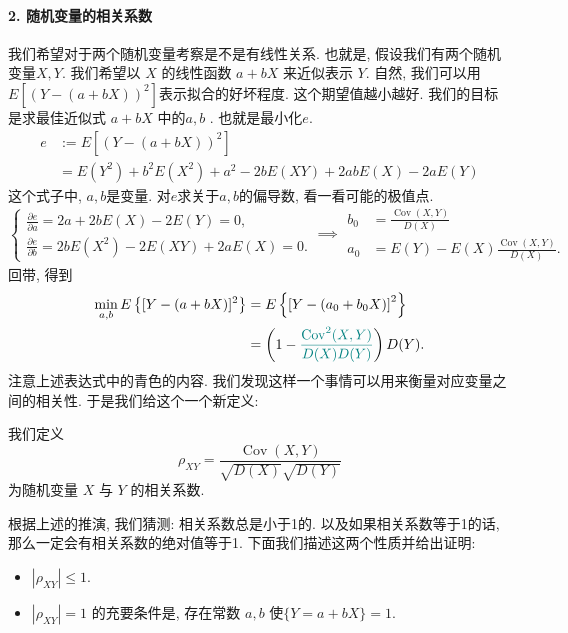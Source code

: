 \paragraph{2. 随机变量的相关系数} 我们希望对于两个随机变量考察是不是有线性关系. 也就是, 假设我们有两个随机变量$X,Y$. 我们希望以 $X$ 的线性函数 $a+b X$ 来近似表示 $Y$. 自然, 我们可以用$E\left[(Y-(a+b X))^2\right]$表示拟合的好坏程度. 这个期望值越小越好. 我们的目标是求最佳近似式 $a+b X$ 中的$a,b$ .
也就是最小化$e$.
 $$
\begin{aligned}
e & :=E\left[(Y-(a+b X))^2\right] \\
& =E\left(Y^2\right)+b^2 E\left(X^2\right)+a^2-2 b E(X Y)+2 a b E(X)-2 a E(Y)
\end{aligned}
$$
这个式子中, $a,b$是变量. 对$e$求关于$a,b $的偏导数, 看一看可能的极值点.
$$
\left\{\begin{array}{l}
\frac{\partial e}{\partial a}=2 a+2 b E(X)-2 E(Y)=0, \\
\frac{\partial e}{\partial b}=2 b E\left(X^2\right)-2 E(X Y)+2 a E(X)=0 .
\end{array}\right. \implies \begin{array}{ll}
b_0 & =\frac{\operatorname{Cov}(X, Y)}{D(X)} \\
a_0 & =E(Y)-E(X) \frac{\operatorname{Cov}(X, Y)}{D(X)} .
\end{array}
$$
回带, 得到
$$
\begin{aligned}
\min _{a, b} E\left\{[Y-(a+b X)]^2\right\} & =E\left\{\left[Y-\left(a_0+b_0 X\right)\right]^2\right\} \\
& =\left(1-{{\color{teal}\frac{\operatorname{Cov}^2(X, Y)}{{D(X)} {D(Y)}}}}\right) D(Y)  .
\end{aligned}
$$
注意上述表达式中的青色的内容. 我们发现这样一个事情可以用来衡量对应变量之间的相关性. 于是我们给这个一个新定义: 

\begin{definition}
    我们定义
    $$
    \rho_{X Y}=\frac{\operatorname{Cov}(X, Y)}{\sqrt{D(X)} \sqrt{D(Y)}}
    $$
    为随机变量 $X$ 与 $Y$ 的相关系数.
\end{definition}

根据上述的推演, 我们猜测: 相关系数总是小于1的. 以及如果相关系数等于1的话, 那么一定会有相关系数的绝对值等于1. 下面我们描述这两个性质并给出证明: 

\begin{itemize}
    \item $\left|\rho_{X Y}\right| \leqslant 1$.
    \item $\left|\rho_{X Y}\right|=1$ 的充要条件是, 存在常数 $a, b$ 使$\{Y=a+b X\}=1$.
\end{itemize}


